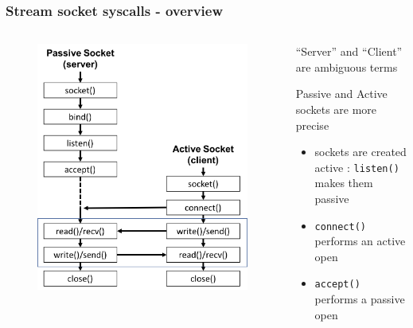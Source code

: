 \documentclass[newPxFont,sthlmFooter,nooffset]{beamer}
\begin{document}
\begin{frame}[t, fragile]
  \frametitle{Stream socket syscalls - overview}
\begin{columns}
\begin{column}{0.5\textwidth}
  \begin{figure}[h]
    \centering
    \includegraphics[width=\linewidth]{figures/fig_socket_syscall.png}
  \end{figure}    
\end{column}
\begin{column}{0.5\textwidth}
 ``Server'' and ``Client'' are ambiguous terms

Passive and Active sockets are more precise
\begin{itemize}
\item sockets are created active : \texttt{listen()} makes them passive
\item \texttt{connect()} performs an active open
\item \texttt{accept()} performs a passive open
\end{itemize}
\end{column}
\end{columns}


\end{frame}
\end{document}
